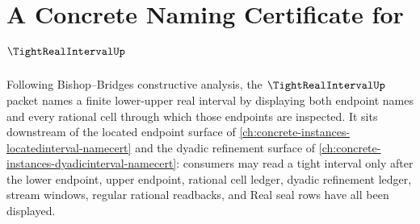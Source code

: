 \chapter{A Concrete Naming Certificate for $\TightRealIntervalUp$}
\label{ch:concrete-instances-tight-real-interval-namecert}

Following Bishop--Bridges constructive analysis, the $\TightRealIntervalUp$ packet names a finite lower-upper real interval by displaying both endpoint names and every rational cell through which those endpoints are inspected. It sits downstream of the located endpoint surface of \autoref{ch:concrete-instances-locatedinterval-namecert} and the dyadic refinement surface of \autoref{ch:concrete-instances-dyadicinterval-namecert}: consumers may read a tight interval only after the lower endpoint, upper endpoint, rational cell ledger, dyadic refinement ledger, stream windows, regular rational readbacks, and Real seal rows have all been displayed.

